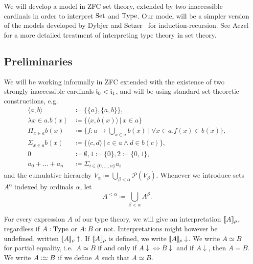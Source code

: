 \documentclass{article}
\begin{document}
We will develop a model in ZFC set theory, extended by two
inaccessible cardinals in order to interpret $\text{Set}$ and $\text{Type}$.  Our
model will be a simpler version of the models developed by Dybjer and
Setzer~\cite{dybjersetzer1999finax,dybjersetzer2006IIR} for
induction-recursion. %
See Aczel \cite{aczel1999typesandsets} for a more detailed treatment
of interpreting type theory in set theory.



\subsection{Preliminaries}

We will be working informally in ZFC extended with the existence of two
strongly inaccessible cardinals $\mathfrak{i}_0 < \mathfrak{i}_1$,
and will be using standard set theoretic constructions, e.g.
\begin{align*}
\langle a, b\rangle &\coloneqq \{ \{ a \}, \{ a, b \}\}, \\
\lambda x \in a.b(x) &\coloneqq \{\langle x, b(x)\rangle\,|\,x \in a \} \\
\Pi_{x \in a}b(x) &\coloneqq \{ f : a \to \bigcup_{x \in a}b(x)\ |\ \forall x \in a.f(x) \in b(x)\}, \\
\Sigma_{x \in a}b(x) &\coloneqq \{ \langle c , d\rangle\ |\ c \in a \land d
\in b(c) \}, \\
0 &\coloneqq \emptyset, 1 \coloneqq \{0\}, 2 \coloneqq \{0, 1\}, \\
a_0 + \ldots + a_n &\coloneqq \Sigma_{i \in \{0, \ldots, n\}}a_i
\end{align*}
and the cumulative hierarchy $V_{\alpha} \coloneqq
\displaystyle\bigcup_{\beta < \alpha} \mathcal{P}(V_{\beta})$. Whenever we
introduce sets $A^{\alpha}$ indexed by ordinals $\alpha$, let \[A^{< \alpha}
\coloneqq \displaystyle\bigcup_{\beta < \alpha}A^{\beta}.\]

For every expression $A$ of our type theory, we will give an interpretation
$\llbracket A \rrbracket_\rho$, regardless if $A : \text{Type}$ or $A : B$ or not. Interpretations
might however be undefined, written $\llbracket A \rrbracket_\rho\uparrow$. If $\llbracket A \rrbracket_\rho$
is defined, we write $\llbracket A \rrbracket_\rho\downarrow$. We write $A \simeq B$ for
partial equality, i.e.\ $A \simeq B$ if and only if $A\downarrow
\Leftrightarrow B\downarrow$ and if $A\downarrow$, then $A = B$. We write $A
\mathrel{\mathop:}\simeq B$ if we define $A$ such that $A \simeq B$.
\end{document}
